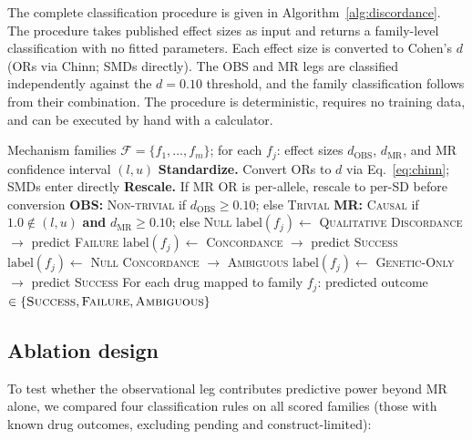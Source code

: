 \documentclass[11pt]{article}
\begin{document}
The complete classification procedure is given in Algorithm~\ref{alg:discordance}. The procedure takes published effect sizes as input and returns a family-level classification with no fitted parameters. Each effect size is converted to Cohen's $d$ (ORs via Chinn; SMDs directly). The OBS and MR legs are classified independently against the $d = 0.10$ threshold, and the family classification follows from their combination. The procedure is deterministic, requires no training data, and can be executed by hand with a calculator.

\begin{algorithm}[t]
\caption{Cross-Design Concordance Classification}
\label{alg:discordance}
\begin{algorithmic}[1]
\REQUIRE Mechanism families $\mathcal{F} = \{f_1, \ldots, f_m\}$; for each $f_j$: effect sizes $d_{\text{OBS}}$, $d_{\text{MR}}$, and MR confidence interval $(l, u)$
\medskip
\STATE \textbf{Standardize.} Convert ORs to $d$ via Eq.~\ref{eq:chinn}; SMDs enter directly
\STATE \textbf{Rescale.} If MR OR is per-allele, rescale to per-SD before conversion
\medskip
{}
  \STATE \textbf{OBS:} \textsc{Non-trivial} if $d_{\text{OBS}} \geq 0.10$; else \textsc{Trivial}
  \STATE \textbf{MR:} \textsc{Causal} if $1.0 \notin (l, u)$ \textbf{and} $d_{\text{MR}} \geq 0.10$; else \textsc{Null}
    \STATE $\text{label}(f_j) \leftarrow$ \textsc{Qualitative Discordance} $\rightarrow$ predict \textsc{Failure}
    \STATE $\text{label}(f_j) \leftarrow$ \textsc{Concordance} $\rightarrow$ predict \textsc{Success}
    \STATE $\text{label}(f_j) \leftarrow$ \textsc{Null Concordance} $\rightarrow$ \textsc{Ambiguous}
    \STATE $\text{label}(f_j) \leftarrow$ \textsc{Genetic-Only} $\rightarrow$ predict \textsc{Success}
  \ENDIF
\ENDFOR
\medskip
\ENSURE For each drug mapped to family $f_j$: predicted outcome $\in \{\textsc{Success}, \textsc{Failure}, \textsc{Ambiguous}\}$
\end{algorithmic}
\end{algorithm}

\subsection{Ablation design}

To test whether the observational leg contributes predictive power beyond MR alone, we compared four classification rules on all scored families (those with known drug outcomes, excluding pending and construct-limited):
\end{document}
